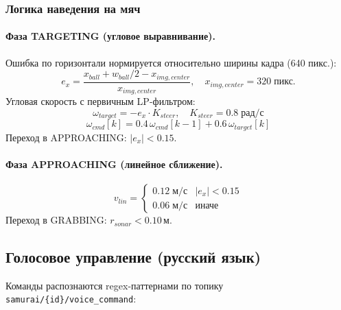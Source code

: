 \documentclass[12pt, a4paper]{article}
\begin{document}
\subsubsection{Логика наведения на мяч}

\paragraph{Фаза TARGETING (угловое выравнивание).}
Ошибка по горизонтали нормируется относительно ширины кадра (640 пикс.):
\begin{equation}
  e_x = \frac{x_{ball} + w_{ball}/2 - x_{img,center}}{x_{img,center}}, \quad x_{img,center} = 320\;\text{пикс.}
\end{equation}
Угловая скорость с первичным LP-фильтром:
\begin{equation}
  \omega_{target} = -e_x \cdot K_{steer},\quad K_{steer} = 0.8\;\text{рад/с}
\end{equation}
\begin{equation}
  \omega_{cmd}[k] = 0.4\,\omega_{cmd}[k-1] + 0.6\,\omega_{target}[k]
\end{equation}
Переход в APPROACHING: $|e_x| < 0.15$.

\paragraph{Фаза APPROACHING (линейное сближение).}
\begin{equation}
  v_{lin} =
  \begin{cases}
    0.12\;\text{м/с} & |e_x| < 0.15 \\
    0.06\;\text{м/с} & \text{иначе}
  \end{cases}
\end{equation}
Переход в GRABBING: $r_{sonar} < 0.10$\,м.

\subsection{Голосовое управление (русский язык)}
\label{sec:voice}

Команды распознаются regex-паттернами по топику \texttt{samurai/\{id\}/voice\_command}:
\end{document}
